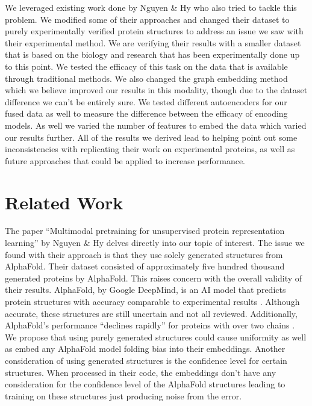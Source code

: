 \documentclass{article}
\begin{document}
We leveraged existing work done by Nguyen \& Hy \citeyearpar{nguyen_2024} who also tried to tackle this problem. We modified some of their approaches and changed their dataset to purely experimentally verified protein structures to address an issue we saw with their experimental method. We are verifying their results with a smaller dataset that is based on the biology and research that has been experimentally done up to this point. We tested the efficacy of this task on the data that is available through traditional methods. We also changed the graph embedding method which we believe improved our results in this modality, though due to the dataset difference we can’t be entirely sure. We tested different autoencoders for our fused data as well to measure the difference between the efficacy of encoding models. As well we varied the number of features to embed the data which varied our results further. All of the results we derived lead to helping point out some inconsistencies with replicating their work on experimental proteins, as well as future approaches that could be applied to increase performance.

\section{Related Work}
The paper “Multimodal pretraining for unsupervised protein representation learning” by Nguyen \& Hy \citeyearpar{nguyen_2024} delves directly into our topic of interest. The issue we found with their approach is that they use solely generated structures from AlphaFold. Their dataset consisted of approximately five hundred thousand generated proteins by AlphaFold. This raises concern with the overall validity of their results. AlphaFold, by Google DeepMind, is an AI model that predicts protein structures with accuracy comparable to experimental results \cite{alphafold}. Although accurate, these structures are still uncertain and not all reviewed. Additionally, AlphaFold’s performance “declines rapidly” for proteins with over two chains \cite{bryant_2022}. We propose that using purely generated structures could cause uniformity as well as embed any AlphaFold model folding bias into their embeddings. Another consideration of using generated structures is the confidence level for certain structures. When processed in their code, the embeddings don’t have any consideration for the confidence level of the AlphaFold structures leading to training on these structures just producing noise from the error. 
\end{document}
